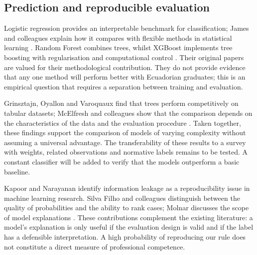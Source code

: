 \subsection{Prediction and reproducible evaluation}



Logistic regression provides an interpretable benchmark for classification; James and colleagues explain how it compares with flexible methods in statistical learning \cite{James2023}. Random Forest combines trees, whilst XGBoost implements tree boosting with regularisation and computational control \cite{Breiman2001,Chen2016}. Their original papers are valued for their methodological contribution. They do not provide evidence that any one method will perform better with Ecuadorian graduates; this is an empirical question that requires a separation between training and evaluation.

Grinsztajn, Oyallon and Varoquaux find that trees perform competitively on tabular datasets; McElfresh and colleagues show that the comparison depends on the characteristics of the data and the evaluation procedure \cite{Grinsztajn2022,McElfresh2023}. Taken together, these findings support the comparison of models of varying complexity without assuming a universal advantage. The transferability of these results to a survey with weights, related observations and normative labels remains to be tested. A constant classifier will be added to verify that the models outperform a basic baseline.

Kapoor and Narayanan identify information leakage as a reproducibility issue in machine learning research. Silva Filho and colleagues distinguish between the quality of probabilities and the ability to rank cases; Molnar discusses the scope of model explanations \cite{Kapoor2023,Molnar2025,SilvaFilho2023}. These contributions complement the existing literature: a model's explanation is only useful if the evaluation design is valid and if the label has a defensible interpretation. A high probability of reproducing our rule does not constitute a direct measure of professional competence.

